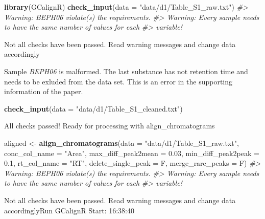 \documentclass[]{article}
\newenvironment{Shaded}{}{}
\newcommand{\KeywordTok}[1]{\textbf{{#1}}}
\newcommand{\DataTypeTok}[1]{\textcolor[rgb]{0.50,0.00,0.00}{{#1}}}
\newcommand{\FloatTok}[1]{\textcolor[rgb]{0.50,0.00,0.50}{{#1}}}
\newcommand{\StringTok}[1]{\textcolor[rgb]{0.87,0.00,0.00}{{#1}}}
\newcommand{\CommentTok}[1]{\textcolor[rgb]{0.50,0.50,0.50}{\textit{{#1}}}}
\newcommand{\NormalTok}[1]{{#1}}
\begin{document}
\begin{Shaded}
\begin{Highlighting}[]
\KeywordTok{library}\NormalTok{(GCalignR)}
\KeywordTok{check_input}\NormalTok{(}\DataTypeTok{data =} \StringTok{"data/d1/Table_S1_raw.txt"}\NormalTok{)}
\CommentTok{#> Warning: BEPH06 violate(s) the requirements.}
\CommentTok{#> Warning: Every sample needs to have the same number of values for each}
\CommentTok{#> variable!}
\end{Highlighting}
\end{Shaded}

Not all checks have been passed. Read warning messages and change data
accordingly

Sample \emph{BEPH06} is malformed. The last substance has not retention
time and needs to be exluded from the data set. This is an error in the
supporting information of the paper.

\begin{Shaded}
\begin{Highlighting}[]
\KeywordTok{check_input}\NormalTok{(}\DataTypeTok{data =} \StringTok{"data/d1/Table_S1_cleaned.txt"}\NormalTok{)}
\end{Highlighting}
\end{Shaded}

All checks passed! Ready for processing with align\_chromatograms

\begin{Shaded}
\begin{Highlighting}[]
\NormalTok{aligned <-}\StringTok{ }\KeywordTok{align_chromatograms}\NormalTok{(}\DataTypeTok{data =} \StringTok{"data/d1/Table_S1_raw.txt"}\NormalTok{,}
                    \DataTypeTok{conc_col_name =} \StringTok{"Area"}\NormalTok{,}
                    \DataTypeTok{max_diff_peak2mean =} \FloatTok{0.03}\NormalTok{,}
                    \DataTypeTok{min_diff_peak2peak =} \FloatTok{0.1}\NormalTok{,}
                    \DataTypeTok{rt_col_name =} \StringTok{"RT"}\NormalTok{,}
                    \DataTypeTok{delete_single_peak =} \NormalTok{F,}
                    \DataTypeTok{merge_rare_peaks =} \NormalTok{F)}
\CommentTok{#> Warning: BEPH06 violate(s) the requirements.}
\CommentTok{#> Warning: Every sample needs to have the same number of values for each}
\CommentTok{#> variable!}
\end{Highlighting}
\end{Shaded}

Not all checks have been passed. Read warning messages and change data
accordinglyRun GCalignR Start: 16:38:40
\end{document}
